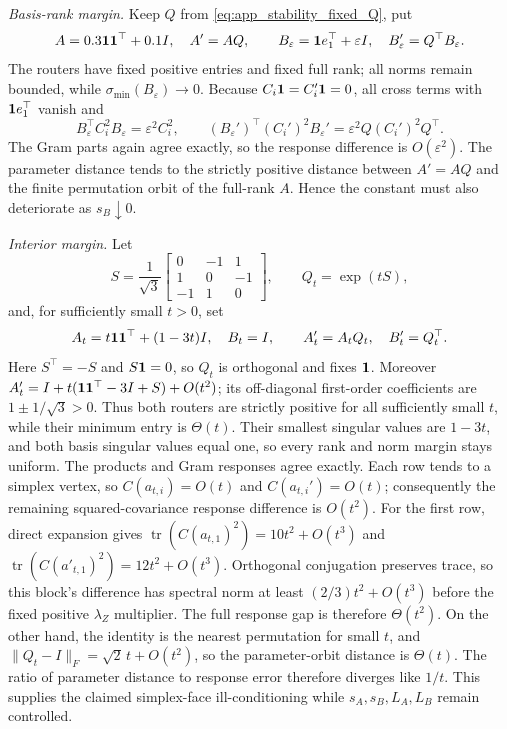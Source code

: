 \emph{Basis-rank margin.}
Keep \(Q\) from \eqref{eq:app_stability_fixed_Q}, put
\[
 A=0.3\mathbf{1}\mathbf{1}^\top+0.1I,\quad A'=AQ,\qquad
 B_\varepsilon=\mathbf{1} e_1^\top+\varepsilon I,\quad
 B_\varepsilon'=Q^\top B_\varepsilon .
\]
The routers have fixed positive entries and fixed full rank; all norms remain
bounded, while \(\sigma_{\min}(B_\varepsilon)\to0\).
Because \(C_i\mathbf{1}=C_i'\mathbf{1}=0\), all cross terms with
\(\mathbf{1} e_1^\top\) vanish and
\[
 B_\varepsilon^\top C_i^2B_\varepsilon=\varepsilon^2C_i^2,\qquad
 (B_\varepsilon')^\top(C_i')^2B_\varepsilon'
 =\varepsilon^2Q(C_i')^2Q^\top .
\]
The Gram parts again agree exactly, so the response difference is
\(O(\varepsilon^2)\).  The parameter distance tends to the strictly positive
distance between \(A'=AQ\) and the finite permutation orbit of the full-rank
\(A\).  Hence the constant must also deteriorate as \(s_B\downarrow0\).

\emph{Interior margin.}
Let
\[
 S=\frac1{\sqrt3}
 \begin{bmatrix}0&-1&1\\1&0&-1\\-1&1&0\end{bmatrix},\qquad
 Q_t=\exp(tS),
 \]
and, for sufficiently small \(t>0\), set
\[
 A_t=t\mathbf{1}\mathbf{1}^\top+(1-3t)I,\quad B_t=I,\qquad
 A_t'=A_tQ_t,\quad B_t'=Q_t^\top .
\]
Here \(S^\top=-S\) and \(S\mathbf{1}=0\), so \(Q_t\) is orthogonal and fixes
\(\mathbf{1}\).  Moreover
\(A_t'=I+t(\mathbf{1}\mathbf{1}^\top-3I+S)+O(t^2)\); its off-diagonal
first-order coefficients are \(1\pm1/\sqrt3>0\).  Thus both routers are
strictly positive for all sufficiently small \(t\), while their minimum entry
is \(\Theta(t)\).  Their smallest singular values are
\(1-3t\), and both basis singular values equal one, so every rank and norm
margin stays uniform.  The products and Gram responses agree exactly.  Each
row tends to a simplex vertex, so
\(C(a_{t,i})=O(t)\) and \(C(a_{t,i}')=O(t)\); consequently the remaining
squared-covariance response difference is \(O(t^2)\). For the first row,
direct expansion gives
$\operatorname{tr}(C(a_{t,1})^2)=10t^2+O(t^3)$ and
$\operatorname{tr}(C(a'_{t,1})^2)=12t^2+O(t^3)$.
Orthogonal conjugation preserves trace, so this block's difference has
spectral norm at least $(2/3)t^2+O(t^3)$ before the fixed positive
$\lambda_Z$ multiplier. The full response gap is therefore $\Theta(t^2)$.
On the other hand,
the identity is the nearest permutation for small \(t\), and
\(\|Q_t-I\|_F=\sqrt2\,t+O(t^2)\), so the parameter-orbit distance is
\(\Theta(t)\).  The ratio of parameter distance to response error therefore
diverges like \(1/t\).  This supplies the claimed simplex-face
ill-conditioning while \(s_A,s_B,L_A,L_B\) remain controlled.

